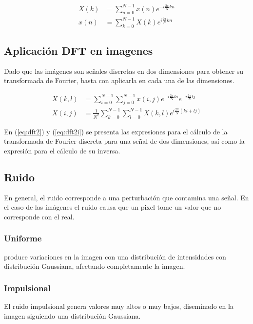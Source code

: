\documentclass[
  letterpaper,
  twocolumn,
  9pt,
  journal,
  final]{IEEEtran}
\begin{document}
\begin{align}
	X(k) &= \sum_{n=0}^{N-1} x(n) e ^{-i \frac{2\pi}{N} k n } \label{eq:dft} \\
	x(n) &= \sum_{k=0}^{N-1} X(k) e ^{ i \frac{2\pi}{N} k n } \label{eq:dfti}
\end{align}

\subsection{Aplicación DFT en imagenes}

Dado que las imágenes son señales discretas en dos dimensiones para obtener su transformada de Fourier, basta con aplicarla en cada una de las dimensiones.

\begin{align}
	X(k,l) &= \sum_{i=0}^{N-1} \sum_{j=0}^{N-1} x(i,j) e ^ {-i \frac{2\pi}{N} k i} e ^ {-i \frac{2\pi}{N} l j} \label{eq:dft2} \\
	X(i,j) &= \frac{1}{N^2} \sum_{k=0}^{N-1} \sum_{l=0}^{N-1} X(k,l) e ^ {i \frac{2\pi}{N} (ki +lj)} \label{eq:dft2i}
\end{align}

En (\ref{eq:dft2}) y (\ref{eq:dft2i}) se presenta las expresiones para el cálculo de la transformada de Fourier discreta para una señal de dos dimensiones, así como la expresión para el cálculo de su inversa.


\subsection{Ruido}

En general, el ruido corresponde a una perturbación que contamina una señal. En el caso de las imágenes el ruido causa que un pixel tome un valor que no corresponde con el real.

\subsubsection{Uniforme}
produce variaciones en la imagen con una distribución de intensidades con distribución Gaussiana, afectando completamente la imagen.

\subsubsection{Impulsional}
El ruido impulsional genera valores muy altos o muy bajos, diseminado en la imagen siguiendo una distribución Gaussiana.
\end{document}
